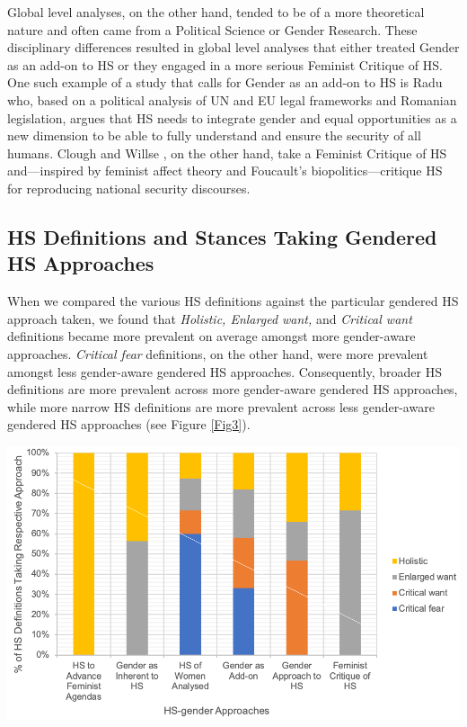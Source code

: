 \documentclass[10pt,a4paper]{article}
\begin{document}
\begin{multicols}{2}
Global level analyses, on the other hand, tended to be of a more theoretical nature and often came from a Political Science or Gender Research. These disciplinary differences resulted in global level analyses that either treated Gender as an add-on to HS or they engaged in a more serious Feminist Critique of HS. One such example of a study that calls for Gender as an add-on to HS is Radu \citep{R55} who, based on a political analysis of UN and EU legal frameworks and Romanian legislation, argues that HS needs to integrate gender and equal opportunities as a new dimension to be able to fully understand and ensure the security of all humans. Clough and Willse \citep{R56}, on the other hand, take a Feminist Critique of HS and---inspired by feminist affect theory and Foucault's biopolitics---critique HS for reproducing national security discourses.

\subsection{HS Definitions and Stances Taking Gendered HS Approaches}

\noindent When we compared the various HS definitions against the particular gendered HS approach taken, we found that \textit{Holistic, Enlarged want,} and \textit{Critical want} definitions became more prevalent on average amongst more gender-aware approaches. \textit{Critical fear} definitions, on the other hand, were more prevalent amongst less gender-aware gendered HS approaches. Consequently, broader HS definitions are more prevalent across more gender-aware gendered HS approaches, while more narrow HS definitions are more prevalent across less gender-aware gendered HS approaches (see Figure \ref{Fig3}).

\end{multicols}

\noindent \begin{minipage}{\columnwidth}
\centering
\resizebox{1\columnwidth}{!}
{\includegraphics[width=1\textwidth]{Fig3.png}}
\label{Fig3}
\end{minipage}
\vspace{\baselineskip}
\end{document}
